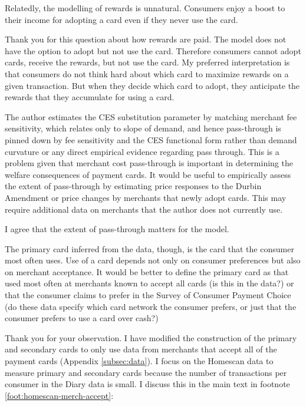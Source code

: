 \documentclass[main.tex]{subfiles}
\begin{document}
\begin{refsection}
\begin{refcommentnoclear}
Relatedly, the modelling of rewards is unnatural.
Consumers enjoy a boost to their income for adopting a card even if they never use the card.
\end{refcommentnoclear}

Thank you for this question about how rewards are paid.
The model does not have the option to adopt but not use the card.
Therefore consumers cannot adopt cards, receive the rewards, but not use the card.
My preferred interpretation is that consumers do not think hard about which card to maximize rewards on a given transaction.
But when they decide which card to adopt, they anticipate the rewards that they accumulate for using a card.

\begin{refcomment}
The author estimates the CES substitution parameter by matching merchant fee sensitivity, which relates only to slope of demand, and hence pass-through is pinned down by fee sensitivity and the CES functional form rather than demand curvature or any direct empirical evidence regarding pass through.
This is a problem given that merchant cost pass-through is important in determining the welfare consequences of payment cards.
It would be useful to empirically assess the extent of pass-through by estimating price responses to the Durbin Amendment or price changes by merchants that newly adopt cards.
This may require additional data on merchants that the author does not currently use.
\end{refcomment}

I agree that the extent of pass-through matters for the model.
\replypassthrough

\begin{refcomment}
The primary card inferred from the data, though, is the card that the consumer most often uses.
Use of a card depends not only on consumer preferences but also on merchant acceptance.
It would be better to define the primary card as that used most often at merchants known to accept all cards (is this in the data?) or that the consumer claims to prefer in the Survey of Consumer Payment Choice (do these data specify which card network the consumer prefers, or just that the consumer prefers to use a card over cash?)
\end{refcomment}

Thank you for your observation.
I have modified the construction of the primary and secondary cards to only use data from merchants that accept all of the payment cards (Appendix \ref{subsec:data}).
I focus on the Homescan data to measure primary and secondary cards because the number of transactions per consumer in the Diary data is small.
I discuss this in the main text in footnote \ref{foot:homescan-merch-accept}:


\end{refsection}
\end{document}
